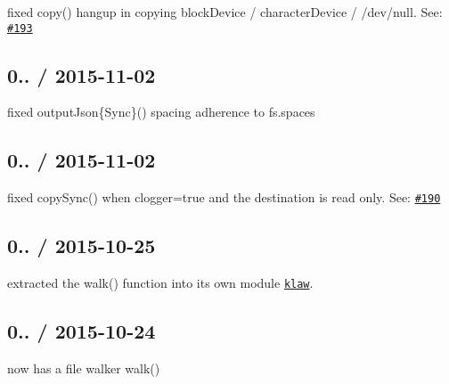 \begin{DoxyItemize}
\item fixed {\ttfamily copy()} hangup in copying block\+Device / character\+Device / {\ttfamily /dev/null}. See\+: \href{https://github.com/jprichardson/node-fs-extra/issues/193}{\tt \#193}
\end{DoxyItemize}

\subsection*{0.. / 2015-\/11-\/02 }


\begin{DoxyItemize}
\item fixed {\ttfamily output\+Json\{Sync\}()} spacing adherence to {\ttfamily fs.\+spaces}
\end{DoxyItemize}

\subsection*{0.. / 2015-\/11-\/02 }


\begin{DoxyItemize}
\item fixed {\ttfamily copy\+Sync()} when {\ttfamily clogger=true} and the destination is read only. See\+: \href{https://github.com/jprichardson/node-fs-extra/pull/190}{\tt \#190}
\end{DoxyItemize}

\subsection*{0.. / 2015-\/10-\/25 }


\begin{DoxyItemize}
\item extracted the {\ttfamily walk()} function into its own module \href{https://github.com/jprichardson/node-klaw}{\tt {\ttfamily klaw}}.
\end{DoxyItemize}

\subsection*{0.. / 2015-\/10-\/24 }


\begin{DoxyItemize}
\item now has a file walker {\ttfamily walk()}
\end{DoxyItemize}

